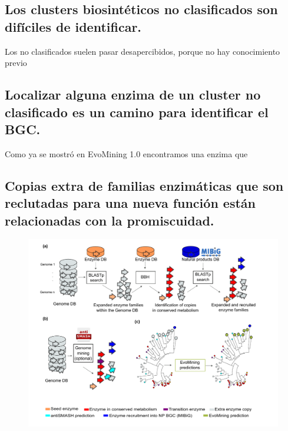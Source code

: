 \documentclass[12pt,twoside]{reedthesis}
\begin{document}
  \subsection{Los clusters biosintéticos no clasificados son difíciles de
  identificar.}\label{los-clusters-biosinteticos-no-clasificados-son-dificiles-de-identificar.}
  
  Los no clasificados suelen pasar desapercibidos, porque no hay
  conocimiento previo
  
  \subsection{Localizar alguna enzima de un cluster no clasificado es un
  camino para identificar el
  BGC.}\label{localizar-alguna-enzima-de-un-cluster-no-clasificado-es-un-camino-para-identificar-el-bgc.}
  
  Como ya se mostró en EvoMining 1.0 encontramos una enzima que
  
  \subsection{Copias extra de familias enzimáticas que son reclutadas para
  una nueva función están relacionadas con la
  promiscuidad.}\label{copias-extra-de-familias-enzimaticas-que-son-reclutadas-para-una-nueva-funcion-estan-relacionadas-con-la-promiscuidad.}
  
  \begin{figure}[h!tbp]
  \centering
  \includegraphics[angle = 0,scale = .7]{chapter2/FigurasPaper/Figure1.pdf}
  \caption[EvoMining Algorithm]{\footnotesize{}}
  \label{fig:EvoMiningAlgorithms}
  \end{figure}
  
\end{document}

